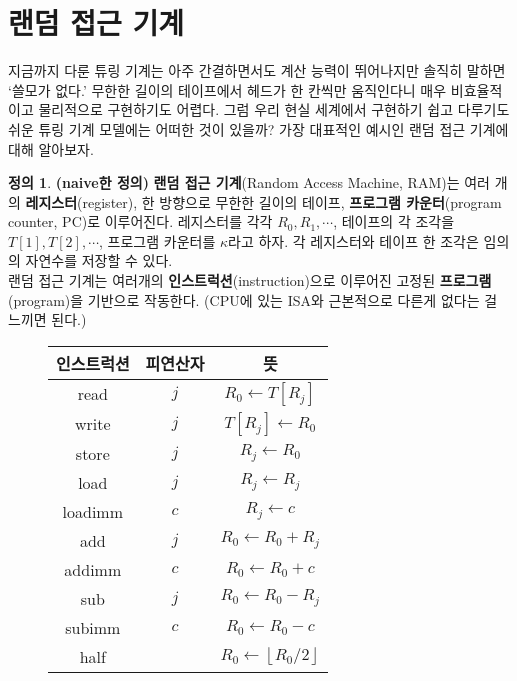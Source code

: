 \documentclass[b5paper]{book}
\theoremstyle{definition}
\newtheorem{defn}{정의}[chapter]
\begin{document}
\section{랜덤 접근 기계}
지금까지 다룬 튜링 기계는 아주 간결하면서도 계산 능력이 뛰어나지만 솔직히 말하면 `쓸모가 없다.'
무한한 길이의 테이프에서 헤드가 한 칸씩만 움직인다니 매우 비효율적이고 
물리적으로 구현하기도 어렵다.
그럼 우리 현실 세계에서 구현하기 쉽고 다루기도 쉬운 튜링 기계 모델에는 어떠한 것이 있을까?
가장 대표적인 예시인 랜덤 접근 기계에 대해 알아보자.
\begin{defn} \textbf{(naive한 정의)}
    \textbf{랜덤 접근 기계}(Random Access Machine, RAM)는 여러 개의 \textbf{레지스터}(register), 한 
    방향으로 무한한 길이의 테이프, \textbf{프로그램 카운터}(program counter, PC)로 이루어진다. 레지스터를 
    각각 $R_0, R_1, \cdots$, 
    테이프의 각 조각을 $T[1], T[2], \cdots $, 프로그램 카운터를 $\kappa$라고 하자. 
    각 레지스터와 테이프 한 조각은 임의의 자연수를 저장할 수 있다. \\ 
    랜덤 접근 기계는 여러개의 \textbf{인스트럭션}(instruction)으로 이루어진 고정된 \textbf{프로그램}(program)을
    기반으로 작동한다. (CPU에 있는 ISA와 근본적으로 다른게 없다는 걸 느끼면 된다.)
    \begin{figure}[!ht] 
        \centering
        \begin{tabular}{ ccc }
            인스트럭션 & 피연산자 & 뜻 \\ 
            \hline
            \hline
            read & $j$ & $R_0 \gets T[R_j]$ \\ 
            \hline
            write & $j$ & $T[R_j] \gets R_0$ \\ 
            \hline 
            store & $j$ & $R_j \gets R_0$ \\ 
            \hline 
            load & $j$ & $R_j \gets R_j$ \\ 
            \hline 
            loadimm & $c$ & $R_j \gets c$ \\ 
            \hline 
            add & $j$ & $R_0 \gets R_0 + R_j$ \\ 
            \hline 
            addimm & $c$ & $R_0 \gets R_0 + c$ \\ 
            \hline 
            sub & $j$ & $R_0 \gets R_0 - R_j$ \\ 
            \hline
            subimm & $c$ & $R_0 \gets R_0 - c$ \\ 
            \hline 
            half & & $R_0 \gets \left\lfloor R_0 / 2 \right\rfloor$ \\ 
            \hline 

\end{tabular}
\end{figure}
\end{defn}
\end{document}
